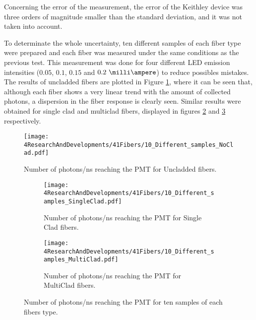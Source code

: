 Concerning the error of the measurement, the error of the Keithley device was three orders of magnitude smaller than the standard deviation, and it was not taken into account.


To determinate the whole uncertainty, ten different samples of each fiber type were prepared and each fiber was measured under the same conditions as the previous test. This measurement was done for four different LED emission intensities ($0.05$, $0.1$, $0.15$ and $0.2~\milli\ampere$) to reduce possibles mistakes. The results of uncladded fibers are plotted in Figure \ref{fig:10samplesNC}, where it can be seen that, although each fiber shows a very linear trend with the amount of collected photons, a dispersion in the fiber response is clearly seen. Similar results were obtained for single clad and multiclad fibers, displayed in figures \ref{subfig:10samplesSC} and \ref{subfig:10samplesMC} respectively.

\begin{figure}[h]
\centering
\texttt{[image: 4ResearchAndDevelopments/41Fibers/10\_Different\_samples\_NoClad.pdf]}
\caption{Number of photons/ns reaching the PMT for Uncladded fibers.\label{fig:10samplesNC}}
\end{figure}

\begin{figure}
\centering
    \begin{subfigure}[b]{0.9\textwidth}
    \centering
    \texttt{[image: 4ResearchAndDevelopments/41Fibers/10\_Different\_samples\_SingleClad.pdf]}  
    \caption{Number of photons/ns reaching the PMT for Single Clad fibers.\label{subfig:10samplesSC}}
    \end{subfigure}
    \hfill
    \begin{subfigure}[b]{0.9\textwidth}
    \centering
    \texttt{[image: 4ResearchAndDevelopments/41Fibers/10\_Different\_samples\_MultiClad.pdf]}  
    \caption{Number of photons/ns reaching the PMT for MultiClad fibers.\label{subfig:10samplesMC}}
    \end{subfigure}
 \caption{Number of photons/ns reaching the PMT for ten samples of each fibers type.}
 \label{fig:10samplesThreeTypes}
\end{figure}

